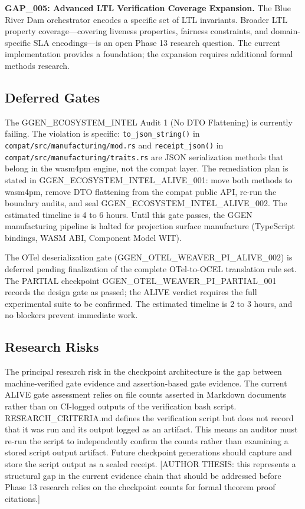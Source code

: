 \textbf{GAP\_005: Advanced LTL Verification Coverage Expansion.} The Blue River Dam orchestrator
encodes a specific set of LTL invariants. Broader LTL property coverage---covering liveness
properties, fairness constraints, and domain-specific SLA encodings---is an open Phase 13 research
question. The current implementation provides a foundation; the expansion requires additional formal
methods research.

\subsection{Deferred Gates}
\label{sec:checkpoints-open-questions-deferred-gates}

The GGEN\_ECOSYSTEM\_INTEL Audit 1 (No DTO Flattening) is currently failing. The violation is
specific: \texttt{to\_json\_string()} in \texttt{compat/src/manufacturing/mod.rs} and
\texttt{receipt\_json()} in \texttt{compat/src/manufacturing/traits.rs} are JSON serialization
methods that belong in the wasm4pm engine, not the compat layer. The remediation plan is stated in
GGEN\_ECOSYSTEM\_INTEL\_ALIVE\_001: move both methods to wasm4pm, remove DTO flattening from the
compat public API, re-run the boundary audits, and seal GGEN\_ECOSYSTEM\_INTEL\_ALIVE\_002. The
estimated timeline is 4 to 6 hours. Until this gate passes, the GGEN manufacturing pipeline is
halted for projection surface manufacture (TypeScript bindings, WASM ABI, Component Model WIT).

The OTel deserialization gate (GGEN\_OTEL\_WEAVER\_PI\_ALIVE\_002) is deferred pending finalization
of the complete OTel-to-OCEL translation rule set. The PARTIAL checkpoint
GGEN\_OTEL\_WEAVER\_PI\_PARTIAL\_001 records the design gate as passed; the ALIVE verdict requires
the full experimental suite to be confirmed. The estimated timeline is 2 to 3 hours, and no
blockers prevent immediate work.

\subsection{Research Risks}
\label{sec:checkpoints-open-questions-risks}

The principal research risk in the checkpoint architecture is the gap between machine-verified gate
evidence and assertion-based gate evidence. The current ALIVE gate assessment relies on file counts
asserted in Markdown documents rather than on CI-logged outputs of the verification bash script.
RESEARCH\_CRITERIA.md defines the verification script but does not record that it was run and its
output logged as an artifact. This means an auditor must re-run the script to independently confirm
the counts rather than examining a stored script output artifact. Future checkpoint generations
should capture and store the script output as a sealed receipt. [AUTHOR THESIS: this represents
a structural gap in the current evidence chain that should be addressed before Phase 13 research
relies on the checkpoint counts for formal theorem proof citations.]

